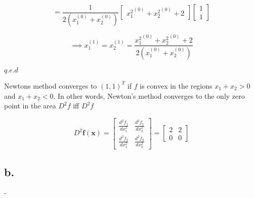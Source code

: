 \documentclass[00-main.tex]{subfiles}
\begin{document}
\begin{equation}
=
\frac{1}{2(x_1^{(0)} + x_2^{(0)})} 
\left[
\begin{array}{cc} 
	{x_1^{2}}^{(0)} + {x_2^2}^{(0)} + 2 
\end{array}
\right]
\left[
\begin{array}{cc} 	
	1 \\
	1
\end{array}
\right]
\end{equation}

\begin{equation}
\implies
x_1^{(1)} = x_2^{(1)}
=
\frac{{x_1^{2}}^{(0)} + {x_2^2}^{(0)} + 2 }{2(x_1^{(0)} + x_2^{(0)})} 
\end{equation}
\label{2a}

$q.e.d$

Newtons method converges to $(1,1)^T$ if $f$ is convex in the regions $x_1+x_2>0$ and $x_1+x_2<0$. In other words, Newton's method converges to the only zero point in the area $D^2f$ iff $D^2 f$ 

\begin{equation}
D^2\mathbf{f}(\mathbf{x})
=
\left[ 	
	\begin{array}{cc} 
		\frac{d^2 f_1}{dx_1^2} & \frac{d^2 f_1}{dx_2^2} \\ 
		\frac{d^2 f_2}{dx_1^2} & \frac{d^2f_2}{dx_2^2}  
	\end{array} 
\right]
=
\left[ 	
	\begin{array}{cc} 
		2 & 2 \\ 
		0    & 0  
	\end{array} 
\right] 
\end{equation}

\subsection*{b.}
-
\end{document}
